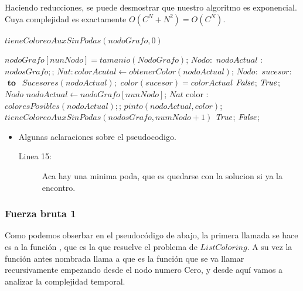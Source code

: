 Haciendo reducciones, se puede desmostrar que nuestro algoritmo es exponencial. Cuya complejidad es exactamente $O(C^N + N^2) = O(C^N)$.

\begin{codebox}
	\li \Return  $tieneColoreoAuxSinPodas(nodoGrafo,0)$%
\end{codebox}

\begin{codebox}
	\li {}
	\li \If $nodoGrafo  [ nunNodo ] = tamanio(NodoGrafo)$; 
			\Then 
	\li			\For $Nodo:$ $nodoActual$ $:$ \To $ nodosGrafo; $; \Comment{} \Do
	\li				$Nat: colorAcutal \leftarrow obtenerColor(nodoActual)$;	
	\li				\For $Nodo:$ $sucesor $:$ \To $ $Sucesores(nodoActual); $\Do
	\li					\If $ color(sucesor) = colorActual$ 
	\li						\Then \Return $\id{False}$;
						\End
					\End
	\li
				\End
	\li		\Return $\id{True}$; 
		\End 	 
	\li $Nodo$ $nodoActual \leftarrow nodoGrafo [ nunNodo ]$;
	\li	\For $Nat$ color $:$ \To $ coloresPosibles(nodoActual); $; \Comment{} \Do 
	\li			$ pinto(nodoActual, color)$;	
	\li 		{}
	\li			\If $ tieneColoreoAuxSinPodas(nodosGrafo, numNodo+1)$ 
	\li					\Return $\id{True}$;
				\End
		\End
	\li {}	
	\li \Return $\id{False}$;	
\end{codebox}


\begin{itemize}
    \item Algunas aclaraciones sobre el pseudocodigo.
		\begin{description}
			\item[Linea 15:] Aca hay una minima poda, que es quedarse con la solucion si ya la encontro.
		\end{description}
\end{itemize}




\subsubsection{Fuerza bruta 1} 
\vspace*{0.3cm}
Como podemos obserbar en el pseudocódigo de abajo, la primera llamada se hace es a la función , que es la que resuelve el problema de $ListColoring$. A su vez la función antes nombrada llama a  que es la función que se va llamar recursivamente empezando desde el nodo numero Cero, y desde aquí vamos a analizar la complejidad temporal. \newline

